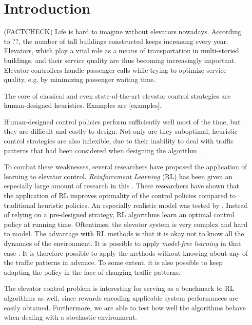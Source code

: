 \section{Introduction}

(FACTCHECK)
Life is hard to imagine without elevators nowadays. According to ??, the number of tall buildings constructed keeps increasing every year. Elevators, which play a vital role as a means of transportation in multi-storied buildings, and their service quality are thus becoming increasingly important. Elevator controllers handle passenger calls while trying to optimize service quality, e.g. by minimizing passenger waiting time.

The core of classical and even state-of-the-art elevator control strategies are human-designed heuristics. Examples are [examples]. 

Human-designed control policies perform sufficiently well most of the time, but they are difficult and costly to design. Not only are they suboptimal, heuristic control strategies are also inflexible, due to their inability to deal with traffic patterns that had been considered when designing the algorithm \cite{walczak2006}.

To combat these weaknesses, several researchers have proposed the application of learning to elevator control. \textit{Reinforcement Learning} (RL) has been given an especially large amount of research in this \cite{crites_barto_1998, pepyne_97, walczak2006, yuan_2008, li_2015}. These researchers have shown that the application of RL improves optimality of the control policies compared to traditional heuristic policies. An especially realistic model was tested by \cite{walczak2006}. Instead of relying on a pre-designed strategy, RL algorithms learn an optimal control policy at running time. Oftentimes, the elevator system is very complex and hard to model. The advantage with RL methods is that it is okay not to know all the dynamics of the environment. It is possible to apply \textit{model-free learning} in that case \cite{sutton_barto_2012}. It is therefore possible to apply the methods without knowing about any of the traffic patterns in advance. To some extent, it is also possible to keep adapting the policy in the face of changing traffic patterns.

The elevator control problem is interesting for serving as a benchmark to RL algorithms as well, since rewards encoding applicable system performances are easily obtained. Furthermore, we are able to test how well the algorithms behave when dealing with a stochastic environment.   







